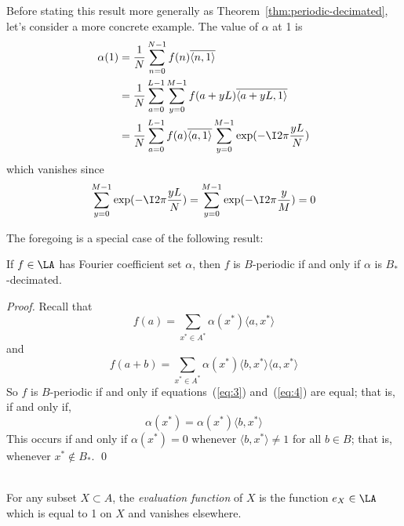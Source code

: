 \begin{example}
Before stating this result more generally as
Theorem~\ref{thm:periodic-decimated}, let's consider a more concrete example. 
The value of $\alpha$ at 1 is
\begin{align*}
\alpha(1) &= \frac{1}{N} \sum_{n=0}^{N-1}f(n)\overline{\langle n,1\rangle}\\
&= \frac{1}{N} \sum_{a=0}^{L-1}\sum_{y = 0}^{M-1}f(a+yL)\overline{\langle a+yL,1\rangle}\\
&= \frac{1}{N} \sum_{a=0}^{L-1}f(a)\overline{\langle a,1\rangle}\sum_{y = 0}^{M-1}\exp(-\I2\pi\frac{yL}{N})
\end{align*}
which vanishes since
\[
\sum_{y = 0}^{M-1}\exp(-\I2\pi\frac{yL}{N})=\sum_{y = 0}^{M-1}\exp(-\I2\pi\frac{y}{M}) = 0
\]
\end{example}
The foregoing is a special case of the following result:
\begin{theorem}\label{thm:periodic-decimated} 
If $f\in \LA$ has Fourier coefficient set $\alpha$, then $f$
  is $B$-periodic if and only if $\alpha$ is $B_*$-decimated.
\end{theorem}
\begin{proof}
Recall that
\begin{equation}\label{eq:3}
f(a) = \sum_{x^*\in A^*} \alpha(x^*) \langle a, x^* \rangle
\end{equation}
and
\begin{equation}\label{eq:4}
f(a+b) = \sum_{x^*\in A^*} \alpha(x^*) \langle b, x^* \rangle 
                                       \langle a, x^* \rangle
\end{equation}
So $f$ is $B$-periodic if and only if equations~(\ref{eq:3}) and~(\ref{eq:4})
are equal; that is, if and only if,
\[
\alpha(x^*) = \alpha(x^*) \langle b, x^* \rangle
\]
This occurs if and only if $\alpha(x^*)=0 $ whenever 
$\langle b, x^* \rangle \neq 1$ for all $b\in B$; that is, whenever
$x^*\notin B_*$. \qed
\end{proof}

\begin{definition}\\
For any subset $X\subset A$, the \emph{evaluation function}
  of $X$ is the function $e_X \in \LA$ which is equal to 1 on $X$ and
  vanishes elsewhere.
\end{definition}

